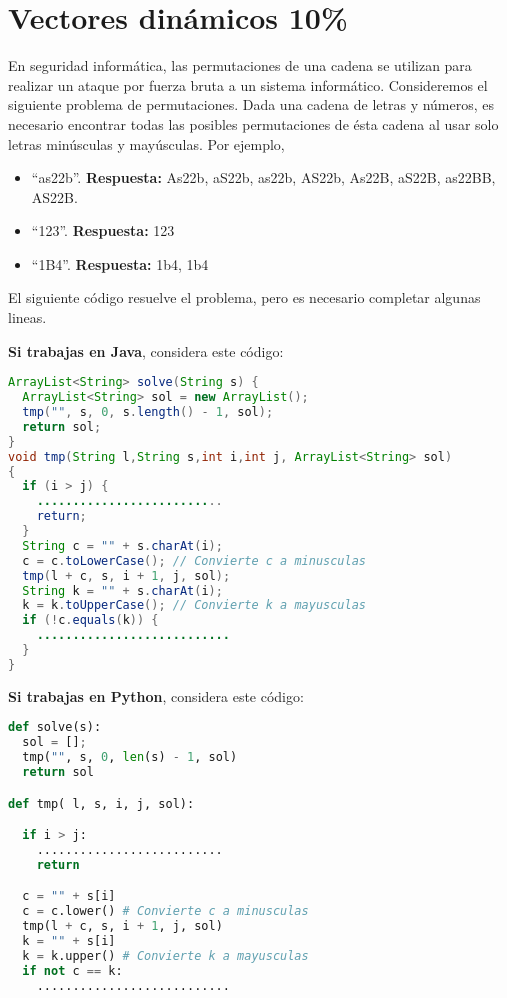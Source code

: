 \documentclass[10 pt]{article}
\begin{document}
\section{Vectores dinámicos 10\%}
En seguridad informática, las permutaciones de una cadena se utilizan para realizar un ataque por fuerza
bruta a un sistema informático. Consideremos el siguiente problema de permutaciones. 
Dada una cadena de letras y números, es necesario encontrar todas las posibles permutaciones de ésta cadena al usar solo letras minúsculas y mayúsculas. Por ejemplo, 
\begin{itemize}
\item ``as22b''. \textbf{Respuesta: } {As22b, aS22b, as22b, AS22b, As22B, aS22B, as22BB, AS22B}.
\item ``123''. \textbf{Respuesta: } {123}
\item ``1B4''. \textbf{Respuesta: } {1b4, 1b4}
\end{itemize}
El siguiente código resuelve el problema, pero es necesario completar algunas lineas.

\hspace{1cm}

\textbf{Si trabajas en Java}, considera este código:

\begin{lstlisting}[language=Java]
ArrayList<String> solve(String s) {
  ArrayList<String> sol = new ArrayList();
  tmp("", s, 0, s.length() - 1, sol);
  return sol;
}
void tmp(String l,String s,int i,int j, ArrayList<String> sol)
{
  if (i > j) {
    ..........................
    return;
  }
  String c = "" + s.charAt(i);
  c = c.toLowerCase(); // Convierte c a minusculas
  tmp(l + c, s, i + 1, j, sol);
  String k = "" + s.charAt(i);
  k = k.toUpperCase(); // Convierte k a mayusculas
  if (!c.equals(k)) {
    ...........................
  }
}
\end{lstlisting}

\hspace{1cm}

\textbf{Si trabajas en Python}, considera este código:

\begin{lstlisting}[language=Python]
def solve(s):
  sol = [];
  tmp("", s, 0, len(s) - 1, sol)
  return sol

def tmp( l, s, i, j, sol):

  if i > j:
    ..........................
    return

  c = "" + s[i]
  c = c.lower() # Convierte c a minusculas
  tmp(l + c, s, i + 1, j, sol)
  k = "" + s[i]
  k = k.upper() # Convierte k a mayusculas
  if not c == k:
    ...........................
\end{lstlisting}
\end{document}
